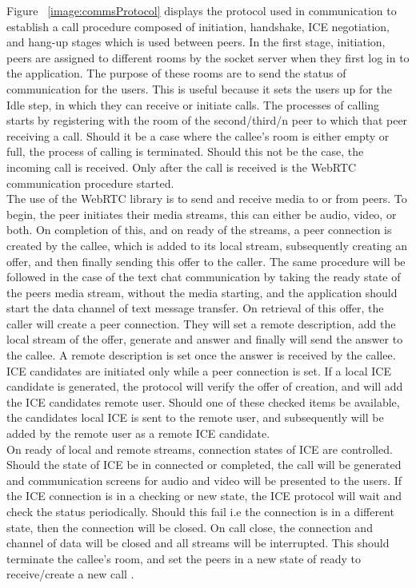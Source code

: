 Figure ~\ref{image:commsProtocol} displays the protocol used in communication to establish a call procedure composed of initiation, handshake, ICE negotiation, and hang-up stages which is used between peers.
In the first stage, initiation, peers are assigned to different rooms by the socket server when they first log in to the application. The purpose of these rooms are to send the status of communication for the users. This is useful because it sets the users up for the Idle step, in which they can receive or initiate calls. The processes of calling starts by registering with the room of the second/third/n peer to which that peer receiving a call. Should it be a case where the callee’s room is either empty or full, the process of calling is terminated. Should this not be the case, the incoming call is received. Only after the call is received is the WebRTC communication procedure started. 
\\The use of the WebRTC library is to send and receive media to or from peers. To begin, the peer initiates their media streams, this can either be audio, video, or both. On completion of this, and on ready of the streams, a peer connection is created by the callee, which is added to its local stream, subsequently creating an offer, and then finally sending this offer to the caller. The same procedure will be followed in the case of the text chat communication by taking the ready state of the peers media stream, without the media starting, and the application should start the data channel of text message transfer. On retrieval of this offer, the caller will create a peer connection. They will set a remote description, add the local stream of the offer, generate and answer and finally will send the answer to the callee. A remote description is set once the answer is received by the callee. ICE candidates are initiated only while a peer connection is set. If a local ICE candidate is generated, the protocol will verify the offer of creation, and will add the ICE candidates remote user. Should one of these checked items be available, the candidates local ICE is sent to the remote user, and subsequently will be added by the remote user as a remote ICE candidate.
\\On ready of local and remote streams, connection states of ICE are controlled. Should the state of ICE be in connected or completed, the call will be generated  and communication screens for audio and video will be presented to the users. If the ICE connection is in a checking or new state, the ICE protocol will wait and check the status periodically. Should this fail i.e the connection is in a different state, then the connection will be closed.
On call close, the connection and channel of data will be closed and all streams will be interrupted. This should terminate the callee’s room, and set the peers in a new state of ready to receive/create a new call \cite{14003034520191201}.

